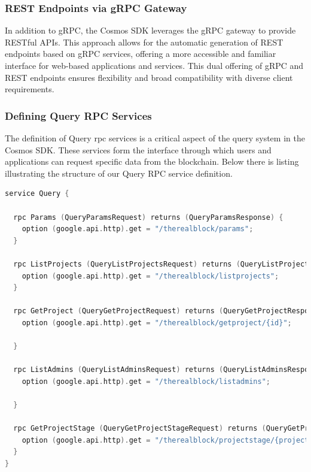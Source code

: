 \subsubsection{REST Endpoints via gRPC Gateway}

In addition to gRPC, the Cosmos SDK leverages the gRPC gateway to provide RESTful APIs. This approach allows for the automatic generation of REST endpoints based on gRPC services, offering a more accessible and familiar interface for web-based applications and services. This dual offering of gRPC and REST endpoints ensures flexibility and broad compatibility with diverse client requirements.

\subsubsection{Defining Query RPC Services}

The definition of Query \gls{rpc} services is a critical aspect of the query system in the Cosmos SDK. These services form the interface through which users and applications can request specific data from the blockchain. Below there is listing illustrating the structure of our Query RPC service definition.

\newpage
\begin{lstlisting}[language=go, caption=Query RPC Services Definition, label={lst:query_rpc_services_definition}]
service Query {
  
  rpc Params (QueryParamsRequest) returns (QueryParamsResponse) {
    option (google.api.http).get = "/therealblock/params";
  }
  
  rpc ListProjects (QueryListProjectsRequest) returns (QueryListProjectsResponse) {
    option (google.api.http).get = "/therealblock/listprojects";
  }
  
  rpc GetProject (QueryGetProjectRequest) returns (QueryGetProjectResponse) {
    option (google.api.http).get = "/therealblock/getproject/{id}";
  
  }
  
  rpc ListAdmins (QueryListAdminsRequest) returns (QueryListAdminsResponse) {
    option (google.api.http).get = "/therealblock/listadmins";
  
  }
  
  rpc GetProjectStage (QueryGetProjectStageRequest) returns (QueryGetProjectStageResponse) {
    option (google.api.http).get = "/therealblock/projectstage/{projectId}";
  }
}
\end{lstlisting}

